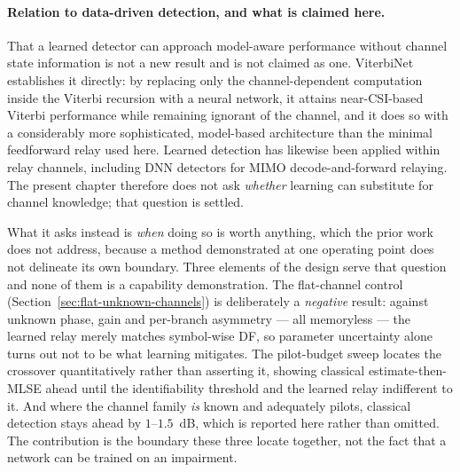 \paragraph{Relation to data-driven detection, and what is claimed here.} That a learned detector can approach model-aware performance without channel state information is not a new result and is not claimed as one. ViterbiNet \cite{Shlezinger2020ViterbiNet} establishes it directly: by replacing only the channel-dependent computation inside the Viterbi recursion with a neural network, it attains near-CSI-based Viterbi performance while remaining ignorant of the channel, and it does so with a considerably more sophisticated, model-based architecture than the minimal feedforward relay used here. Learned detection has likewise been applied within relay channels, including DNN detectors for MIMO decode-and-forward relaying. The present chapter therefore does not ask \emph{whether} learning can substitute for channel knowledge; that question is settled.

What it asks instead is \emph{when} doing so is worth anything, which the prior work does not address, because a method demonstrated at one operating point does not delineate its own boundary. Three elements of the design serve that question and none of them is a capability demonstration. The flat-channel control (Section~\ref{sec:flat-unknown-channels}) is deliberately a \emph{negative} result: against unknown phase, gain and per-branch asymmetry --- all memoryless --- the learned relay merely matches symbol-wise DF, so parameter uncertainty alone turns out not to be what learning mitigates. The pilot-budget sweep locates the crossover quantitatively rather than asserting it, showing classical estimate-then-MLSE ahead until the identifiability threshold and the learned relay indifferent to it. And where the channel family \emph{is} known and adequately pilots, classical detection stays ahead by $1$--$1.5$~dB, which is reported here rather than omitted. The contribution is the boundary these three locate together, not the fact that a network can be trained on an impairment.

